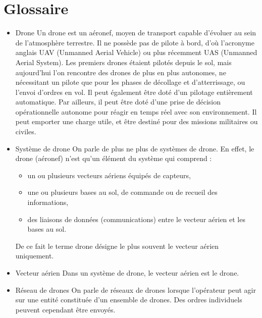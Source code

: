 \section*{Glossaire}
\begin{itemize}
  \item Drone\newline
Un drone est un aéronef, moyen de transport capable d'évoluer au sein de
l'atmosphère terrestre. Il ne possède pas de pilote à bord, d’où l’acronyme
anglais UAV (Unmanned Aerial Vehicle) ou plus récemment UAS (Unmanned
Aerial System). Les premiers drones étaient pilotés depuis le sol, mais
aujourd’hui l’on rencontre des drones de plus en plus autonomes, ne
nécessitant un pilote que pour les phases de décollage et d’atterrissage,
ou l'envoi d'ordres en vol. Il peut également être doté d'un pilotage
entièrement automatique. Par ailleurs, il peut être doté d'une prise de
décision opérationnelle autonome pour réagir en temps réel avec son
environnement. Il peut emporter une charge utile, et être destiné pour des
missions militaires ou civiles.\newline

  \item Système de drone\newline
On parle de plus ne plus de systèmes de drone. En effet, le drone (aéronef)
n'est qu'un élément du système qui comprend :
\begin{itemize}
  \item un ou plusieurs vecteurs aériens équipés de capteurs,
  \item une ou plusieurs bases au sol, de commande ou de recueil des
    informations,
  \item des liaisons de données (communications) entre le vecteur aérien et les
bases au sol.
\end{itemize}
De ce fait le terme drone désigne le plus souvent le vecteur aérien
uniquement.\newline

  \item Vecteur aérien\newline
Dans un système de drone, le vecteur aérien est le drone.\newline

  \item Réseau de drones\newline
On parle de réseaux de drones lorsque l’opérateur peut agir sur une entité
constituée d’un ensemble de drones. Des ordres individuels peuvent
cependant être envoyés.\newline


\end{itemize}
